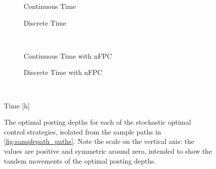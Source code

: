 \begin{figure}%
\centering%
\begin{subfigure}[b]{.4\linewidth}%
  \centering%
  \setlength\figureheight{\linewidth}%
  \setlength\figurewidth{\linewidth}%
  \caption{Continuous Time}%
\end{subfigure}%
\hspace{1.5cm}%
\begin{subfigure}[b]{.4\linewidth}%
  \setlength\figureheight{\linewidth}%
  \setlength\figurewidth{\linewidth}%
  \caption{Discrete Time}%
\end{subfigure}\\%
\vspace{1cm}%
\begin{subfigure}[b]{.4\linewidth}%
  \setlength\figureheight{\linewidth}%
  \setlength\figurewidth{\linewidth}%
  \caption{Continuous Time with nFPC}%
\end{subfigure}%
\hspace{1.5cm}%
\begin{subfigure}[b]{.4\linewidth}%
  \setlength\figureheight{\linewidth}%
  \setlength\figurewidth{\linewidth}%
  \caption{Discrete Time with nFPC}%
\end{subfigure}\\%
\leavevmode{}\hspace{0pt plus 1filll}\null%

Time [h]

\vspace{1cm}%
  \caption[Comparison of optimal posting depths on the sample path]{The optimal posting depths for each of the stochastic optimal control strategies, isolated from the sample paths in \autoref{fig:samplepath_paths}. Note the scale on the vertical axis: the values are positive and symmetric around zero, intended to show the tandem movements of the optimal posting depths.}\label{fig:samplepath_depths}%
\end{figure}
